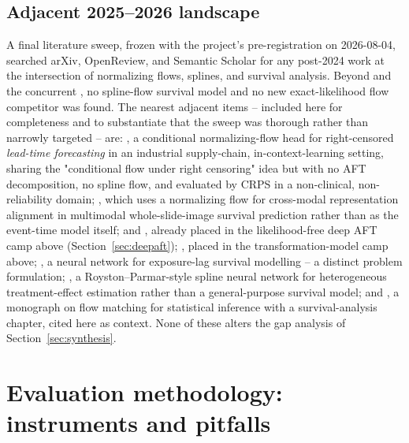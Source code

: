 \documentclass[11pt]{article}
\begin{document}
\subsection{Adjacent 2025--2026 landscape}
A final literature sweep, frozen with the project's pre-registration on
2026-08-04, searched arXiv, OpenReview, and Semantic Scholar for any
post-2024 work at the intersection of normalizing flows, splines, and
survival analysis. Beyond \citet{ausset2021flows} and the concurrent
\citet{licai2026}, no spline-flow survival model and no new
exact-likelihood flow competitor was found. The nearest adjacent items --
included here for completeness and to substantiate that the sweep was
thorough rather than narrowly targeted -- are: \citet{lticl2026}, a
conditional normalizing-flow head for right-censored \emph{lead-time
forecasting} in an industrial supply-chain, in-context-learning setting,
sharing the "conditional flow under right censoring" idea but with no AFT
decomposition, no spline flow, and evaluated by CRPS in a non-clinical,
non-reliability domain; \citet{yin2025multimodal}, which uses a
normalizing flow for cross-modal representation alignment in multimodal
whole-slide-image survival prediction rather than as the event-time
model itself; \citet{graft2026} and \citet{dart2023}, already placed in
the likelihood-free deep AFT camp above (Section~\ref{sec:deepaft});
\citet{yuan2025transformation}, placed in the transformation-model camp
above; \citet{cennsurv2025}, a neural network for exposure-lag survival
modelling -- a distinct problem formulation; \citet{gregorio2023}, a
Royston--Parmar-style spline neural network for heterogeneous
treatment-effect estimation rather than a general-purpose survival model;
and \citet{eguchi2026}, a monograph on flow matching for statistical
inference with a survival-analysis chapter, cited here as context. None
of these alters the gap analysis of Section~\ref{sec:synthesis}.

\section{Evaluation methodology: instruments and pitfalls}
\label{sec:evaluation}
\end{document}
